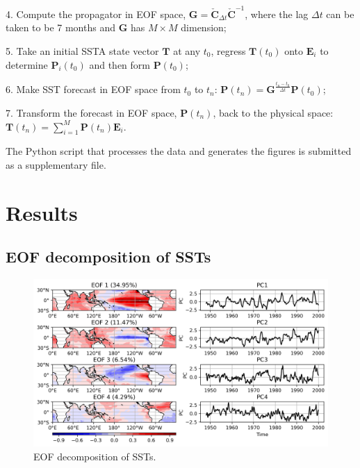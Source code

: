 \documentclass[12pt,a4paper]{article}
\begin{document}
4. Compute the propagator in EOF space, $\mathbf{G}=\mathbf{\check{C}}_{\Delta t} \mathbf{\check{C}}^{-1}$, where the lag $\Delta t$ can be taken to be 7 months and $\mathbf{G}$ has $M\times M$ dimension;

5. Take an initial SSTA state vector $\mathbf{T}$ at any $t_0$, regress $\mathbf{T}(t_0)$ onto $\mathbf{E}_i$ to determine $\mathbf{P}_i(t_0)$ and then form $\mathbf{P}(t_0)$;

6. Make SST forecast in EOF space from $t_0$ to $t_n$: $\mathbf{P}(t_n) = \mathbf{G}^{\frac{t_n-t_0}{\Delta t}}\mathbf{P}(t_0)$;

7. Transform the forecast in EOF space, $\mathbf{P}(t_n)$, back to the physical space: $\mathbf{T}(t_n)=\sum _{i=1}^M \mathbf{P}(t_n) \mathbf{E}_i$.

The Python script that processes the data and generates the figures is submitted as a supplementary file.

\section{Results}\label{results}

\subsection{EOF decomposition of SSTs}\label{eof-decomposition}

\begin{figure}[htbp]
\centering
\includegraphics[width=\textwidth]{figures/EOFs_PCs.png}
\caption{EOF decomposition of SSTs.}
\label{fig:EOFs_PCs}
\end{figure}
\end{document}
